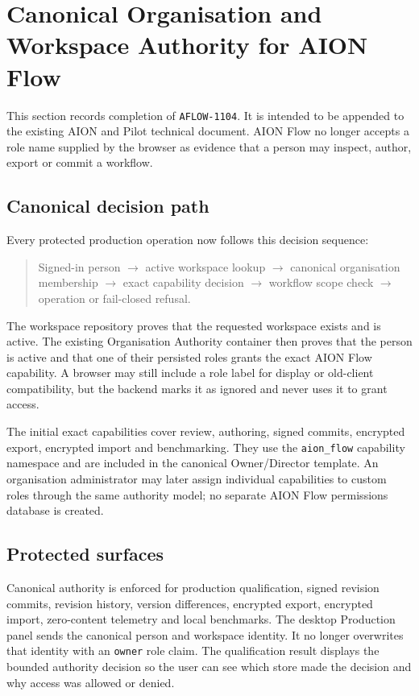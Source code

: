 \section{Canonical Organisation and Workspace Authority for AION Flow}
\label{sec:aion-flow-canonical-authority}

This section records completion of \texttt{AFLOW-1104}. It is intended to be appended to the
existing AION and Pilot technical document. AION Flow no longer accepts a role name supplied by
the browser as evidence that a person may inspect, author, export or commit a workflow.

\subsection{Canonical decision path}

Every protected production operation now follows this decision sequence:

\begin{quote}
Signed-in person $\rightarrow$ active workspace lookup $\rightarrow$ canonical organisation
membership $\rightarrow$ exact capability decision $\rightarrow$ workflow scope check
$\rightarrow$ operation or fail-closed refusal.
\end{quote}

The workspace repository proves that the requested workspace exists and is active. The existing
Organisation Authority container then proves that the person is active and that one of their
persisted roles grants the exact AION Flow capability. A browser may still include a role label for
display or old-client compatibility, but the backend marks it as ignored and never uses it to
grant access.

The initial exact capabilities cover review, authoring, signed commits, encrypted export,
encrypted import and benchmarking. They use the \texttt{aion\_flow} capability namespace and are
included in the canonical Owner/Director template. An
organisation administrator may later assign individual capabilities to custom roles through the
same authority model; no separate AION Flow permissions database is created.

\subsection{Protected surfaces}

Canonical authority is enforced for production qualification, signed revision commits, revision
history, version differences, encrypted export, encrypted import, zero-content telemetry and local
benchmarks. The desktop Production panel sends the canonical person and workspace identity. It no
longer overwrites that identity with an \texttt{owner} role claim. The qualification result displays
the bounded authority decision so the user can see which store made the decision and why access was
allowed or denied.

